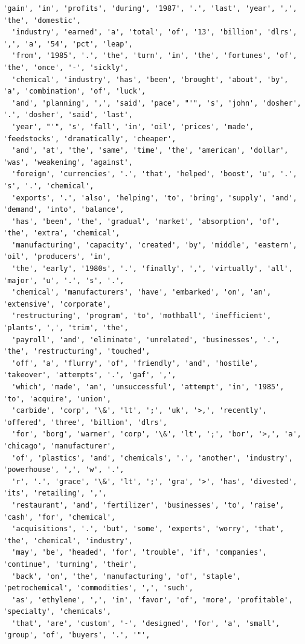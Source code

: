 \documentclass[11pt]{article}
\begin{document}
\begin{Verbatim}[commandchars=\\\{\}]
  'gain', 'in', 'profits', 'during', '1987', '.', 'last', 'year', ',', 'the', 'domestic',
  'industry', 'earned', 'a', 'total', 'of', '13', 'billion', 'dlrs', ',', 'a', '54', 'pct', 'leap',
  'from', '1985', '.', 'the', 'turn', 'in', 'the', 'fortunes', 'of', 'the', 'once', '-', 'sickly',
  'chemical', 'industry', 'has', 'been', 'brought', 'about', 'by', 'a', 'combination', 'of', 'luck',
  'and', 'planning', ',', 'said', 'pace', "'", 's', 'john', 'dosher', '.', 'dosher', 'said', 'last',
  'year', "'", 's', 'fall', 'in', 'oil', 'prices', 'made', 'feedstocks', 'dramatically', 'cheaper',
  'and', 'at', 'the', 'same', 'time', 'the', 'american', 'dollar', 'was', 'weakening', 'against',
  'foreign', 'currencies', '.', 'that', 'helped', 'boost', 'u', '.', 's', '.', 'chemical',
  'exports', '.', 'also', 'helping', 'to', 'bring', 'supply', 'and', 'demand', 'into', 'balance',
  'has', 'been', 'the', 'gradual', 'market', 'absorption', 'of', 'the', 'extra', 'chemical',
  'manufacturing', 'capacity', 'created', 'by', 'middle', 'eastern', 'oil', 'producers', 'in',
  'the', 'early', '1980s', '.', 'finally', ',', 'virtually', 'all', 'major', 'u', '.', 's', '.',
  'chemical', 'manufacturers', 'have', 'embarked', 'on', 'an', 'extensive', 'corporate',
  'restructuring', 'program', 'to', 'mothball', 'inefficient', 'plants', ',', 'trim', 'the',
  'payroll', 'and', 'eliminate', 'unrelated', 'businesses', '.', 'the', 'restructuring', 'touched',
  'off', 'a', 'flurry', 'of', 'friendly', 'and', 'hostile', 'takeover', 'attempts', '.', 'gaf', ',',
  'which', 'made', 'an', 'unsuccessful', 'attempt', 'in', '1985', 'to', 'acquire', 'union',
  'carbide', 'corp', '\&', 'lt', ';', 'uk', '>,', 'recently', 'offered', 'three', 'billion', 'dlrs',
  'for', 'borg', 'warner', 'corp', '\&', 'lt', ';', 'bor', '>,', 'a', 'chicago', 'manufacturer',
  'of', 'plastics', 'and', 'chemicals', '.', 'another', 'industry', 'powerhouse', ',', 'w', '.',
  'r', '.', 'grace', '\&', 'lt', ';', 'gra', '>', 'has', 'divested', 'its', 'retailing', ',',
  'restaurant', 'and', 'fertilizer', 'businesses', 'to', 'raise', 'cash', 'for', 'chemical',
  'acquisitions', '.', 'but', 'some', 'experts', 'worry', 'that', 'the', 'chemical', 'industry',
  'may', 'be', 'headed', 'for', 'trouble', 'if', 'companies', 'continue', 'turning', 'their',
  'back', 'on', 'the', 'manufacturing', 'of', 'staple', 'petrochemical', 'commodities', ',', 'such',
  'as', 'ethylene', ',', 'in', 'favor', 'of', 'more', 'profitable', 'specialty', 'chemicals',
  'that', 'are', 'custom', '-', 'designed', 'for', 'a', 'small', 'group', 'of', 'buyers', '.', '"',

\end{Verbatim}
\end{document}
